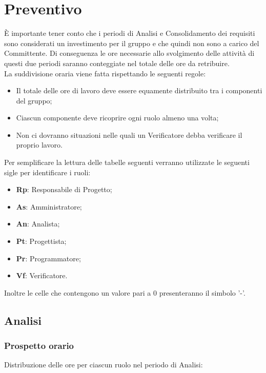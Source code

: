\section{Preventivo}
È importante tener conto che i periodi di Analisi e Consolidamento dei requisiti sono considerati un investimento per il gruppo e che quindi non sono a carico del Committente.
Di conseguenza le ore necessarie allo svolgimento delle attività di questi due periodi saranno conteggiate nel totale delle ore da retribuire. \\

La suddivisione oraria viene fatta rispettando le seguenti regole:
\begin{itemize}
	\item Il totale delle ore di lavoro deve essere equamente distribuito tra i componenti del gruppo;
	\item Ciascun componente deve ricoprire ogni ruolo almeno una volta;
	\item Non ci dovranno situazioni nelle quali un Verificatore debba verificare il proprio lavoro.
\end{itemize}

Per semplificare la lettura delle tabelle seguenti verranno utilizzate le seguenti sigle per identificare i ruoli: 
\begin{itemize}
	\item \textbf{Rp}: Responsabile di Progetto;
	\item \textbf{As}: Amministratore;
	\item \textbf{An}: Analista;
	\item \textbf{Pt}: Progettista;
	\item \textbf{Pr}: Programmatore;
	\item \textbf{Vf}: Verificatore.
\end{itemize}
Inoltre le celle che contengono un valore pari a 0 presenteranno il simbolo '-'.

\newpage

\subsection{Analisi}
	\subsubsection{Prospetto orario}
		Distribuzione delle ore per ciascun ruolo nel periodo di Analisi:
		
